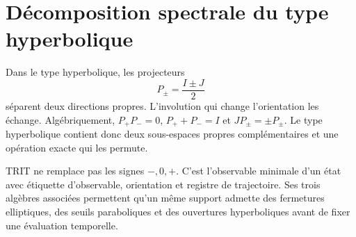 \section{Décomposition spectrale du type hyperbolique}

Dans le type hyperbolique, les projecteurs
\[
P_\pm=\frac{I\pm J}{2}
\]
séparent deux directions propres. L'involution qui change l'orientation les
échange. Algébriquement, \(P_+P_-=0\), \(P_++P_-=I\) et
\(JP_\pm=\pm P_\pm\). Le type hyperbolique contient donc deux sous-espaces
propres complémentaires et une opération exacte qui les permute.

\begin{remark}
TRIT ne remplace pas les signes \(-,0,+\). C'est l'observable minimale d'un
état avec étiquette d'observable, orientation et registre de trajectoire.
Ses trois algèbres associées permettent
qu'un même support admette des fermetures elliptiques, des seuils paraboliques et des ouvertures
hyperboliques avant de fixer une évaluation temporelle.
\end{remark}
\fi
